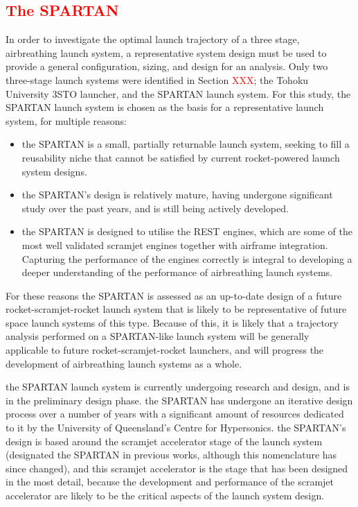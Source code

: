 \textcolor{red}{
\section{The SPARTAN}
}


In order to investigate the optimal launch trajectory of a three stage, airbreathing launch system, a representative system design must be used to provide a general configuration, sizing, and design for an analysis. Only two three-stage launch systems were identified in Section \textcolor{red}{XXX}; the Tohoku University 3STO launcher, and the SPARTAN launch system. For this study, the SPARTAN launch system is chosen as the basis for a representative launch system, for multiple reasons:
\begin{itemize}
	\item the SPARTAN is a small, partially returnable launch system, seeking to fill a reusability niche that cannot be satisfied by current rocket-powered launch system designs.
	\item the SPARTAN's design is relatively mature, having undergone significant study over the past years, and is still being actively developed.
	\item the SPARTAN is designed to utilise the REST engines, which are some of the most well validated scramjet engines together with airframe integration. Capturing the performance of the engines correctly is integral to developing a deeper understanding of the performance of airbreathing launch systems.
\end{itemize}
For these reasons the SPARTAN is assessed as an up-to-date design of a future rocket-scramjet-rocket launch system that is likely to be representative of future space launch systems of this type. Because of this, it is likely that a trajectory analysis performed on a SPARTAN-like launch system will be generally applicable to future rocket-scramjet-rocket launchers, and will progress the development of airbreathing launch systems as a whole. 




 

 the SPARTAN launch system is currently undergoing research and design, and is in the preliminary design phase. the SPARTAN has undergone an iterative design process over a number of years\cite{Jazra2013,Preller2017b} with a significant amount of resources dedicated to it by the University of Queensland's Centre for Hypersonics.
 the SPARTAN's design is based around the scramjet accelerator stage of the launch system (designated the SPARTAN in previous works, although this nomenclature has since changed), and this scramjet accelerator is the stage that has been designed in the most detail\cite{Jazra2013,Preller2017b}, because the development and performance of the scramjet accelerator are likely to be the critical aspects of the launch system design. 
 
